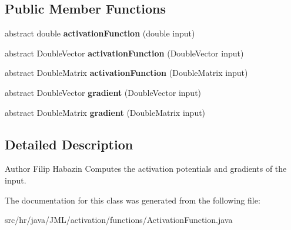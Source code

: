 \subsection*{Public Member Functions}
\begin{DoxyCompactItemize}
\item 
\hypertarget{classhr_1_1java_1_1_j_m_l_1_1activation_1_1functions_1_1_activation_function_a55b04fcc4abcfe1ce8cc0cf2b3684d78}{abstract double {\bfseries activation\+Function} (double input)}\label{classhr_1_1java_1_1_j_m_l_1_1activation_1_1functions_1_1_activation_function_a55b04fcc4abcfe1ce8cc0cf2b3684d78}

\item 
\hypertarget{classhr_1_1java_1_1_j_m_l_1_1activation_1_1functions_1_1_activation_function_ab4d3452125f5606ddddd87c8095c7a5b}{abstract Double\+Vector {\bfseries activation\+Function} (Double\+Vector input)}\label{classhr_1_1java_1_1_j_m_l_1_1activation_1_1functions_1_1_activation_function_ab4d3452125f5606ddddd87c8095c7a5b}

\item 
\hypertarget{classhr_1_1java_1_1_j_m_l_1_1activation_1_1functions_1_1_activation_function_a5eecb5e3b1ebb310ad9d3ab0f93c17a5}{abstract Double\+Matrix {\bfseries activation\+Function} (Double\+Matrix input)}\label{classhr_1_1java_1_1_j_m_l_1_1activation_1_1functions_1_1_activation_function_a5eecb5e3b1ebb310ad9d3ab0f93c17a5}

\item 
\hypertarget{classhr_1_1java_1_1_j_m_l_1_1activation_1_1functions_1_1_activation_function_a8e2d974e438fc1e06facbf0dabfc35a8}{abstract Double\+Vector {\bfseries gradient} (Double\+Vector input)}\label{classhr_1_1java_1_1_j_m_l_1_1activation_1_1functions_1_1_activation_function_a8e2d974e438fc1e06facbf0dabfc35a8}

\item 
\hypertarget{classhr_1_1java_1_1_j_m_l_1_1activation_1_1functions_1_1_activation_function_ad66d3bfec2470e41241a7808a83d755a}{abstract Double\+Matrix {\bfseries gradient} (Double\+Matrix input)}\label{classhr_1_1java_1_1_j_m_l_1_1activation_1_1functions_1_1_activation_function_ad66d3bfec2470e41241a7808a83d755a}

\end{DoxyCompactItemize}


\subsection{Detailed Description}
\begin{DoxyAuthor}{Author}
Filip Habazin Computes the activation potentials and gradients of the input. 
\end{DoxyAuthor}


The documentation for this class was generated from the following file\+:\begin{DoxyCompactItemize}
\item 
src/hr/java/\+J\+M\+L/activation/functions/Activation\+Function.\+java\end{DoxyCompactItemize}
